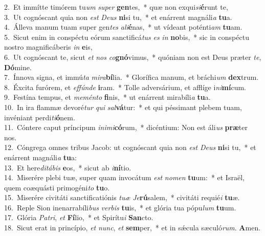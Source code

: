 {2.~}Et immítte timórem tu\textit{um} \textit{su}\textit{per} \textbf{gen}tes,~* quæ non exqui\textit{si}\textbf{é}runt te,\\
{3.~}Ut cognóscant quia non \textit{est} \textit{De}\textit{us} \textbf{ni}si tu,~* et enárrent magnáli\textit{a} \textbf{tu}a.\\
{4.~}Álleva manum tuam super gen\textit{tes} \textit{a}\textit{li}\textbf{é}nas,~* ut vídeant poténti\textit{am} \textbf{tu}am.\\
{5.~}Sicut enim in conspéctu eórum sanctificá\textit{tus} \textit{es} \textit{in} \textbf{no}bis,~* sic in conspéctu nostro magnificáberis \textit{in} \textbf{e}is,\\
{6.~}Ut cognóscant te, sicut \textit{et} \textit{nos} \textit{co}\textbf{gnó}vimus,~* quóniam non est Deus præter \textit{te}, \textbf{Dó}mine.\\
{7.~}Ínnova signa, et immú\textit{ta} \textit{mi}\textit{ra}\textbf{bí}lia.~* Glorífica manum, et bráchi\textit{um} \textbf{dex}trum.\\
{8.~}Éxcita furórem, et \textit{ef}\textit{fún}\textit{de} \textbf{i}ram.~* Tolle adversárium, et afflíge i\textit{ni}\textbf{mí}cum.\\
{9.~}Festína tempus, et \textit{me}\textit{mén}\textit{to} \textbf{fi}nis,~* ut enárrent mirabíli\textit{a} \textbf{tu}a.\\
{10.~}In ira flammæ devoré\textit{tur} \textit{qui} \textit{sal}\textbf{vá}tur:~* et qui péssimant plebem tuam, invéniant perdi\textit{ti}\textbf{ó}nem.\\
{11.~}Cóntere caput príncipum \textit{i}\textit{ni}\textit{mi}\textbf{có}rum,~* dicéntium: Non est áli\textit{us} \textbf{præ}ter nos.\\
{12.~}Cóngrega omnes tribus Jacob: ut cognóscant quia non \textit{est} \textit{De}\textit{us} \textbf{ni}si tu,~* et enárrent magnáli\textit{a} \textbf{tu}a:\\
{13.~}Et here\textit{di}\textit{tá}\textit{bis} \textbf{e}os,~* sicut ab \textit{i}\textbf{ní}tio.\\
{14.~}Miserére plebi tuæ, super quam invocátum \textit{est} \textit{no}\textit{men} \textbf{tu}um:~* et Israël, quem coæquásti primogéni\textit{to} \textbf{tu}o.\\
{15.~}Miserére civitáti sanctificatiónis \textit{tu}\textit{æ} \textit{Je}\textbf{rú}salem,~* civitáti requié\textit{i} \textbf{tu}æ.\\
{16.~}Reple Sion inenarrabíli\textit{bus} \textit{ver}\textit{bis} \textbf{tu}is,~* et glória tua pópu\textit{lum} \textbf{tu}um.\\
{17.~}Glória \textit{Pa}\textit{tri}, \textit{et} \textbf{Fí}lio,~* et Spirítu\textit{i} \textbf{San}cto.\\
{18.~}Sicut erat in princípio, \textit{et} \textit{nunc}, \textit{et} \textbf{sem}per,~* et in sǽcula sæculó\textit{rum}. \textbf{A}men.\\
